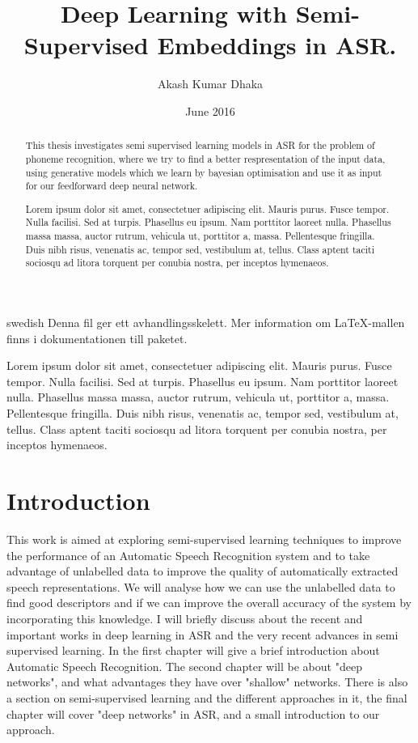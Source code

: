 \documentclass[a4paper,11pt]{kth-mag}
\title{Deep Learning with Semi-Supervised Embeddings in ASR.}
\author{Akash Kumar Dhaka}
\date{June 2016}
\begin{document}
\frontmatter
\pagestyle{empty}
\removepagenumbers
\maketitle
{}
\begin{abstract}
This thesis investigates semi supervised learning models in ASR for the problem
of phoneme recognition, where we try to find a better respresentation of the input 
data, using generative models which we learn by bayesian optimisation and use it
as input for our feedforward deep neural network.


Lorem ipsum dolor sit amet, consectetuer adipiscing elit. Mauris
purus. Fusce tempor. Nulla facilisi. Sed at turpis. Phasellus eu
ipsum. Nam porttitor laoreet nulla. Phasellus massa massa, auctor
rutrum, vehicula ut, porttitor a, massa. Pellentesque fringilla. Duis
nibh risus, venenatis ac, tempor sed, vestibulum at, tellus. Class
aptent taciti sociosqu ad litora torquent per conubia nostra, per
inceptos hymenaeos.
\end{abstract}
\clearpage
\begin{foreignabstract}{swedish}
  Denna fil ger ett avhandlingsskelett.
  Mer information om \LaTeX-mallen finns i
  dokumentationen till paketet.

Lorem ipsum dolor sit amet, consectetuer adipiscing elit. Mauris
purus. Fusce tempor. Nulla facilisi. Sed at turpis. Phasellus eu
ipsum. Nam porttitor laoreet nulla. Phasellus massa massa, auctor
rutrum, vehicula ut, porttitor a, massa. Pellentesque fringilla. Duis
nibh risus, venenatis ac, tempor sed, vestibulum at, tellus. Class
aptent taciti sociosqu ad litora torquent per conubia nostra, per
inceptos hymenaeos.
\end{foreignabstract}
\clearpage
\tableofcontents*
\mainmatter
\pagestyle{newchap}
\chapter{Introduction}
This work is aimed at exploring semi-supervised learning techniques to improve
 the performance of an Automatic Speech Recognition system and to take advantage
 of unlabelled data to improve the quality of automatically extracted speech
 representations. We will analyse how we can use the unlabelled data to find good
 descriptors and if we can improve the overall accuracy of the system by
 incorporating this knowledge. I will briefly discuss about the recent and
 important works in deep learning in ASR and the very recent advances in semi
 supervised learning. In the first chapter will give a brief introduction about
 Automatic Speech Recognition. The second chapter will be about "deep networks",
 and what advantages they have over "shallow" networks. There is also  a section
 on semi-supervised learning and the different approaches in it, the final
 chapter will cover "deep networks" in ASR, and a small introduction to our approach. 
\end{document}
